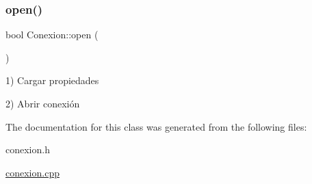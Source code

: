 \subsubsection{\texorpdfstring{open()}{open()}}
{\footnotesize\ttfamily bool Conexion\+::open (\begin{DoxyParamCaption}{ }\end{DoxyParamCaption})}

1) Cargar propiedades

2) Abrir conexión 

The documentation for this class was generated from the following files\+:\begin{DoxyCompactItemize}
\item 
conexion.\+h\item 
\mbox{\hyperlink{conexion_8cpp}{conexion.\+cpp}}\end{DoxyCompactItemize}
